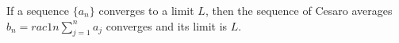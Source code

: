 If a sequence $\{a_n\}$ converges to a limit $L$, then the sequence of Cesaro averages $b_n = rac{1}{n}\sum_{j=1}^n a_j$ converges and its limit is $L$.
